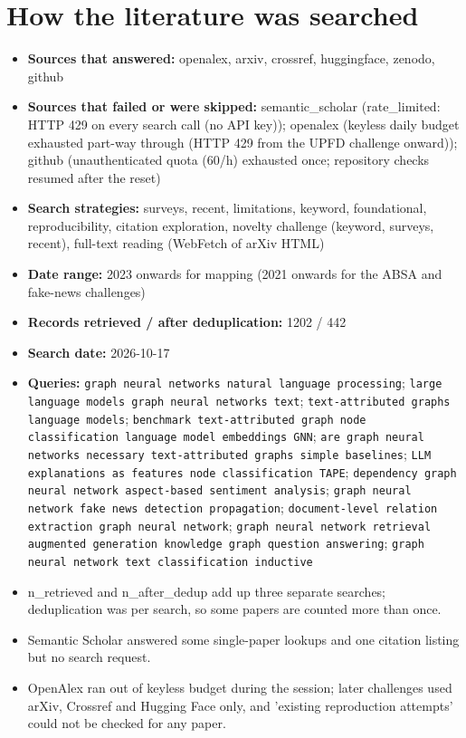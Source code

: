 \documentclass[11pt,a4paper]{article}
\begin{document}
\section{How the literature was searched}

\begin{itemize}
\item \textbf{Sources that answered:} openalex, arxiv, crossref, huggingface, zenodo, github
\item \textbf{Sources that failed or were skipped:} semantic\_scholar (rate\_limited: HTTP 429 on every search call (no API key)); openalex (keyless daily budget exhausted part-way through (HTTP 429 from the UPFD challenge onward)); github (unauthenticated quota (60/h) exhausted once; repository checks resumed after the reset)
\item \textbf{Search strategies:} surveys, recent, limitations, keyword, foundational, reproducibility, citation exploration, novelty challenge (keyword, surveys, recent), full-text reading (WebFetch of arXiv HTML)
\item \textbf{Date range:} 2023 onwards for mapping (2021 onwards for the ABSA and fake-news challenges)
\item \textbf{Records retrieved / after deduplication:} 1202 / 442
\item \textbf{Search date:} 2026-10-17
\item \textbf{Queries:} \texttt{graph neural networks natural language processing}; \texttt{large language models graph neural networks text}; \texttt{text-attributed graphs language models}; \texttt{benchmark text-attributed graph node classification language model embeddings GNN}; \texttt{are graph neural networks necessary text-attributed graphs simple baselines}; \texttt{LLM explanations as features node classification TAPE}; \texttt{dependency graph neural network aspect-based sentiment analysis}; \texttt{graph neural network fake news detection propagation}; \texttt{document-level relation extraction graph neural network}; \texttt{graph neural network retrieval augmented generation knowledge graph question answering}; \texttt{graph neural network text classification inductive}
\item n\_retrieved and n\_after\_dedup add up three separate searches; deduplication was per search, so some papers are counted more than once.
\item Semantic Scholar answered some single-paper lookups and one citation listing but no search request.
\item OpenAlex ran out of keyless budget during the session; later challenges used arXiv, Crossref and Hugging Face only, and 'existing reproduction attempts' could not be checked for any paper.

\end{itemize}
\end{document}
